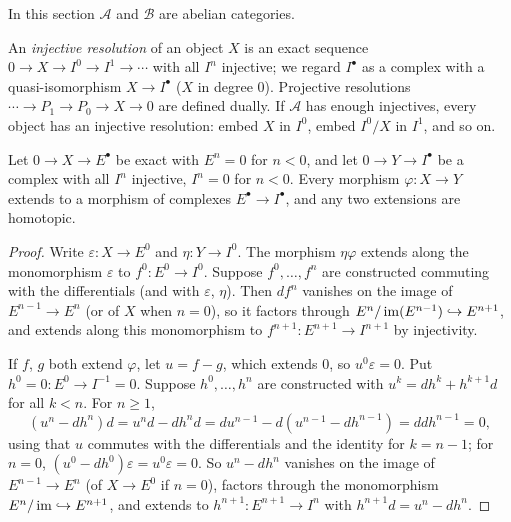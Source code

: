 In this section $\mathcal{A}$ and $\mathcal{B}$ are abelian categories.

\begin{definition}\label{homological-algebra:definition-resolution}
An \emph{injective resolution} of an object $X$ is an exact sequence $0 \to X \to I^0 \to I^1 \to \cdots$ with all $I^n$
injective; we regard $I^\bullet$ as a complex with a quasi-isomorphism $X \to I^\bullet$ ($X$ in degree $0$). Projective
resolutions $\cdots \to P_1 \to P_0 \to X \to 0$ are defined dually. If $\mathcal{A}$ has enough injectives, every object has
an injective resolution: embed $X$ in $I^0$, embed $I^0/X$ in $I^1$, and so on.
\end{definition}

\begin{theorem}\label{homological-algebra:theorem-comparison}
Let $0 \to X \to E^\bullet$ be exact with $E^n = 0$ for $n < 0$, and let $0 \to Y \to I^\bullet$ be a complex with all $I^n$ injective,
$I^n = 0$ for $n < 0$. Every morphism $\varphi \colon X \to Y$ extends to a morphism of complexes $E^\bullet \to I^\bullet$, and any two
extensions are homotopic.
\end{theorem}

\begin{proof}
Write $\varepsilon \colon X \to E^0$ and $\eta \colon Y \to I^0$. The morphism $\eta\varphi$ extends along the monomorphism $\varepsilon$ to
$f^0 \colon E^0 \to I^0$. Suppose $f^0, \ldots, f^n$ are constructed commuting with the differentials (and with $\varepsilon$, $\eta$).
Then $d f^n$ vanishes on the image of $E^{n-1} \to E^n$ (or of $X$ when $n = 0$), so it factors through
$E^n/\operatorname{im}(E^{n-1}) \hookrightarrow E^{n+1}$, and extends along this monomorphism to $f^{n+1} \colon E^{n+1} \to I^{n+1}$ by injectivity.

If $f$, $g$ both extend $\varphi$, let $u = f - g$, which extends $0$, so $u^0\varepsilon = 0$. Put $h^0 = 0 \colon E^0 \to I^{-1} = 0$.
Suppose $h^0, \ldots, h^n$ are constructed with $u^k = dh^k + h^{k+1}d$ for all $k < n$. For $n \geq 1$,
\[
(u^n - dh^n)d = u^nd - dh^nd = du^{n-1} - d(u^{n-1} - dh^{n-1}) = ddh^{n-1} = 0,
\]
using that $u$ commutes with the differentials and the identity for $k = n - 1$; for $n = 0$, $(u^0 - dh^0)\varepsilon = u^0\varepsilon = 0$.
So $u^n - dh^n$ vanishes on the image of $E^{n-1} \to E^n$ (of $X \to E^0$ if $n = 0$), factors through the monomorphism
$E^n/\operatorname{im} \hookrightarrow E^{n+1}$, and extends to $h^{n+1} \colon E^{n+1} \to I^n$ with $h^{n+1}d = u^n - dh^n$.
\end{proof}


